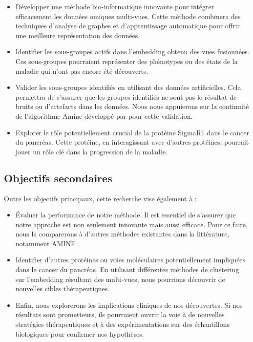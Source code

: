 \begin{itemize}
    \item Développer une méthode bio-informatique innovante pour intégrer efficacement les données omiques multi-vues. Cette méthode combinera des techniques d'analyse de graphes et d'apprentissage automatique pour offrir une meilleure représentation des données.
    \item Identifier les sous-groupes actifs dans l'embedding obtenu des vues fusionnées. Ces sous-groupes pourraient représenter des phénotypes ou des états de la maladie qui n'ont pas encore été découverts.
    \item Valider les sous-groupes identifiés en utilisant des données artificielles. Cela permettra de s'assurer que les groupes identifiés ne sont pas le résultat de bruits ou d'artefacts dans les données. Nous nous appuierons sur la continuité de l'algorithme Amine développé par \cite{Pasquier2023} pour cette validation.
    \item Explorer le rôle potentiellement crucial de la protéine SigmaR1 dans le cancer du pancréas. Cette protéine, en interagissant avec d'autres protéines, pourrait jouer un rôle clé dans la progression de la maladie.
\end{itemize}

\subsection{Objectifs secondaires}

Outre les objectifs principaux, cette recherche vise également à :

\begin{itemize}
    \item Évaluer la performance de notre méthode. Il est essentiel de s'assurer que notre approche est non seulement innovante mais aussi efficace. Pour ce faire, nous la comparerons à d'autres méthodes existantes dans la littérature, notamment AMINE \cite{Pasquier2023}.
    \item Identifier d'autres protéines ou voies moléculaires potentiellement impliquées dans le cancer du pancréas. En utilisant différentes méthodes de clustering sur l'embedding résultant des multi-vues, nous pourrions découvrir de nouvelles cibles thérapeutiques.
    \item Enfin, nous explorerons les implications cliniques de nos découvertes. Si nos résultats sont prometteurs, ils pourraient ouvrir la voie à de nouvelles stratégies thérapeutiques et à des expérimentations sur des échantillons biologiques pour confirmer nos hypothèses.
\end{itemize}



